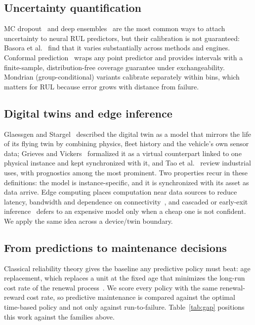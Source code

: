 \documentclass[pdflatex,sn-mathphys-num]{sn-jnl}
\begin{document}
\subsection{Uncertainty quantification}
MC dropout~\cite{gal2016dropout} and deep ensembles~\cite{lakshminarayanan2017ensembles} are the most common ways to attach uncertainty to neural RUL predictors, but their calibration is not guaranteed: Basora et al.~\cite{basora2023uqbench} find that it varies substantially across methods and engines. Conformal prediction~\cite{vovk2005alrw,angelopoulos2021gentle} wraps any point predictor and provides intervals with a finite-sample, distribution-free coverage guarantee under exchangeability. Mondrian (group-conditional) variants calibrate separately within bins, which matters for RUL because error grows with distance from failure.

\subsection{Digital twins and edge inference}
Glaessgen and Stargel~\cite{glaessgen2012digital} described the digital twin as a model that mirrors the life of its flying twin by combining physics, fleet history and the vehicle's own sensor data; Grieves and Vickers~\cite{grieves2017digital} formalized it as a virtual counterpart linked to one physical instance and kept synchronized with it, and Tao et al.~\cite{tao2019digital} review industrial uses, with prognostics among the most prominent. Two properties recur in these definitions: the model is instance-specific, and it is synchronized with its asset as data arrive. Edge computing places computation near data sources to reduce latency, bandwidth and dependence on connectivity~\cite{shi2016edge}, and cascaded or early-exit inference~\cite{teerapittayanon2016branchynet} defers to an expensive model only when a cheap one is not confident. We apply the same idea across a device/twin boundary.

\subsection{From predictions to maintenance decisions}
Classical reliability theory gives the baseline any predictive policy must beat: age replacement, which replaces a unit at the fixed age that minimizes the long-run cost rate of the renewal process~\cite{barlow1960optimum}. We score every policy with the same renewal-reward cost rate, so predictive maintenance is compared against the optimal time-based policy and not only against run-to-failure. Table~\ref{tab:gap} positions this work against the families above.
\end{document}
